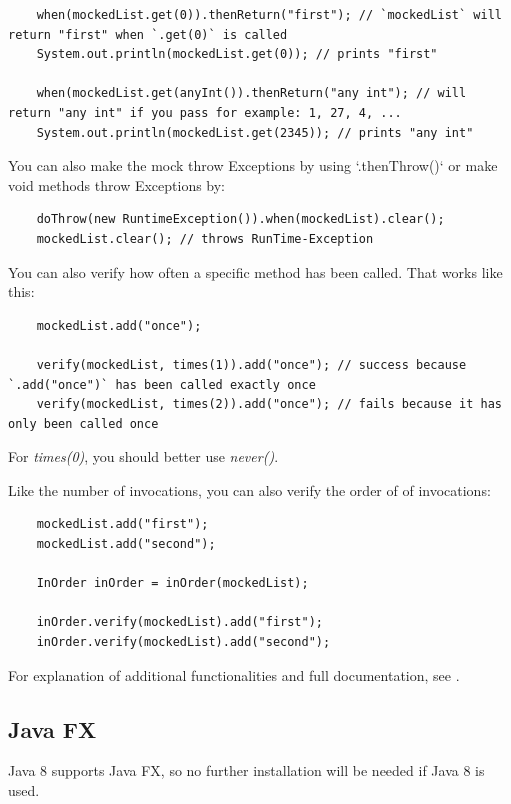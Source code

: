 \documentclass[11pt, a4paper]{article}
\begin{document}
\begin{lstlisting}
    when(mockedList.get(0)).thenReturn("first"); // `mockedList` will return "first" when `.get(0)` is called
    System.out.println(mockedList.get(0)); // prints "first"
    
    when(mockedList.get(anyInt()).thenReturn("any int"); // will return "any int" if you pass for example: 1, 27, 4, ...
    System.out.println(mockedList.get(2345)); // prints "any int"
\end{lstlisting}

You can also make the mock throw Exceptions by using `.thenThrow()` or make void methods throw Exceptions by:

\begin{lstlisting}
    doThrow(new RuntimeException()).when(mockedList).clear();
    mockedList.clear(); // throws RunTime-Exception
\end{lstlisting}

You can also verify how often a specific method has been called. That works like this:

\begin{lstlisting}
    mockedList.add("once");
    
    verify(mockedList, times(1)).add("once"); // success because `.add("once")` has been called exactly once
    verify(mockedList, times(2)).add("once"); // fails because it has only been called once
\end{lstlisting}

For \textit{times(0)}, you should better use \textit{never()}.
 
Like the number of invocations, you can also verify the order of of invocations:

\begin{lstlisting}
    mockedList.add("first");
    mockedList.add("second");
    
    InOrder inOrder = inOrder(mockedList);
    
    inOrder.verify(mockedList).add("first");
    inOrder.verify(mockedList).add("second");  
\end{lstlisting} 
    
For explanation of additional functionalities and full documentation, see \cite{MockitoDownload}.

\subsection{Java FX}
Java 8 supports Java FX, so no further installation will be needed if Java 8 is used. 
\end{document}
